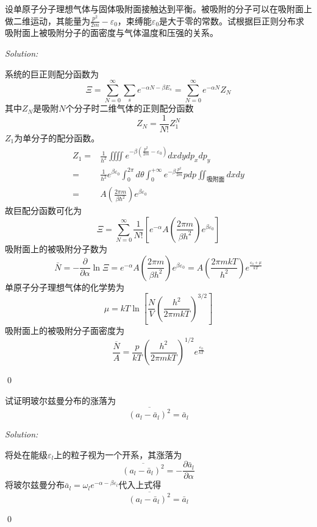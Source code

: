 \documentclass[12pt,a4paper]{article}
\newenvironment{problem}[2][Problem]{\begin{trivlist}
\item[\hskip \labelsep {\bfseries #1}\hskip \labelsep {\bfseries #2.}]}{\end{trivlist}}
\newenvironment{sol}
    {\emph{Solution:}
    }
    {
    \qed
    }
\begin{document}
\begin{problem}{9.19}
设单原子分子理想气体与固体吸附面接触达到平衡。被吸附的分子可以在吸附面上做二维运动，其能量为$\frac{p^2}{2m}-\varepsilon_0$，束缚能$\varepsilon_0$是大于零的常数。试根据巨正则分布求吸附面上被吸附分子的面密度与气体温度和压强的关系。
\end{problem}
\begin{sol}
系统的巨正则配分函数为
\begin{equation}
\Xi=\sum_{N=0}^{\infty}\sum_se^{-\alpha N-\beta E_s}=\sum_{N=0}^{\infty}e^{-\alpha N}Z_N
\end{equation}
其中$Z_N$是吸附$N$个分子时二维气体的正则配分函数
\begin{equation}
Z_N=\frac{1}{N!}Z_1^N
\end{equation}
$Z_1$为单分子的配分函数。
\begin{align}
\nonumber Z_1=&\frac{1}{h^2}\iiiint e^{-\beta(\frac{p^2}{2m}-\varepsilon_0)}dxdydp_xdp_y\\
\nonumber=&\frac{1}{h^2}e^{\beta\varepsilon_0}\int_0^{2\pi}d\theta\int_0^{+\infty}e^{-\beta\frac{p^2}{2m}}pdp\iint_{\text{吸附面}}dxdy\\
=&A\left(\frac{2\pi m}{\beta\hbar^2}\right)e^{\beta\varepsilon_0}
\end{align}
故巨配分函数可化为
\begin{equation}
\Xi=\sum_{N=0}^{\infty}\frac{1}{N!}\left[e^{-\alpha}A\left(\frac{2\pi m}{\beta h^2}\right)e^{\beta\varepsilon_0}\right]
\end{equation}
吸附面上的被吸附分子数为
\begin{equation}
\bar{N}=-\frac{\partial}{\partial\alpha}\ln\Xi=e^{-\alpha}A\left(\frac{2\pi m}{\beta h^2}\right)e^{\beta\varepsilon_0}=A\left(\frac{2\pi mkT}{h^2}\right)e^{\frac{\varepsilon_0+\mu}{kT}}
\end{equation}
单原子分子理想气体的化学势为
\begin{equation}
\mu=kT\ln\left[\frac{N}{V}\left(\frac{h^2}{2\pi mkT}\right)^{3/2}\right]
\end{equation}
吸附面上的被吸附分子面密度为
\begin{equation}
\frac{\overline{N}}{A}=\frac{p}{kT}\left(\frac{h^2}{2\pi mkT}\right)^{1/2}e^{\frac{\varepsilon_0}{kT}}
\end{equation}
\end{sol}

\begin{problem}{9.21}
试证明玻尔兹曼分布的涨落为
\[
\overline{(a_l-\bar{a}_l)^2}=\bar{a}_l
\]
\end{problem}
\begin{sol}
将处在能级$\varepsilon_l$上的粒子视为一个开系，其涨落为
\begin{equation}
\overline{(a_l-\bar{a}_l)^2}=-\frac{\partial\bar{a}_l}{\partial\alpha}
\end{equation}
将玻尔兹曼分布$\bar{a}_l=\omega_le^{-\alpha-\beta\varepsilon_l}$代入上式得
\begin{equation}
\overline{(a_l-\bar{a}_l)^2}=\bar{a}_l
\end{equation}
\end{sol}
\end{document}
